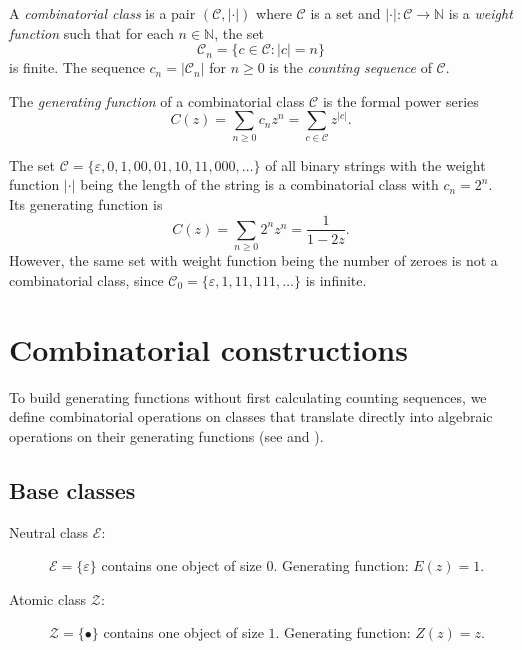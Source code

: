 
\begin{definition}
A \emph{combinatorial class} is a pair \((\mathcal{C}, |\cdot|)\) where \(\mathcal{C}\) is a set and \(|\cdot|\colon \mathcal{C}\to \mathbb{N}\) is a \emph{weight function} such that for each \(n\in \mathbb{N}\), the set
\[
    \mathcal{C}_n = \{c\in \mathcal{C} : |c|=n\}
\]
is finite.
The sequence \(c_n = |\mathcal{C}_n|\) for \(n \ge 0\) is the \emph{counting sequence} of \(\mathcal{C}\).
\end{definition}

\begin{definition}
The \emph{generating function} of a combinatorial class \(\mathcal{C}\) is the formal power series
\[
    C(z) = \sum_{n\ge 0} c_n z^n = \sum_{c\in \mathcal{C}} z^{|c|}.
\]
\end{definition}

\begin{example}
The set \(\mathcal{C} = \{\varepsilon, 0, 1, 00, 01, 10, 11, 000, \dots\}\) of all binary strings with the weight function \(|\cdot|\) being the length of the string is a combinatorial class with \(c_n = 2^n\). Its generating function is
\[
    C(z) = \sum_{n\ge 0} 2^n z^n = \frac{1}{1-2z}.
\]
However, the same set with weight function being the number of zeroes is not a combinatorial class, since \(\mathcal{C}_0 = \{\varepsilon, 1, 11, 111, \dots\}\) is infinite.
\end{example}

\section*{Combinatorial constructions}

To build generating functions without first calculating counting sequences, we define combinatorial operations on classes that translate directly into algebraic operations on their generating functions (see \cite[Chapter 5]{MelczerNotes} and \cite[Chapter I]{FlajoletSedgewick2009}).

\subsection*{Base classes}
\begin{description}
    \item[Neutral class \(\mathcal{E}\):] \(\mathcal{E} = \{\varepsilon\}\) contains one object of size \(0\). Generating function: \(E(z) = 1\).
    \item[Atomic class \(\mathcal{Z}\):] \(\mathcal{Z} = \{\bullet\}\) contains one object of size \(1\). Generating function: \(Z(z) = z\).
\end{description}

